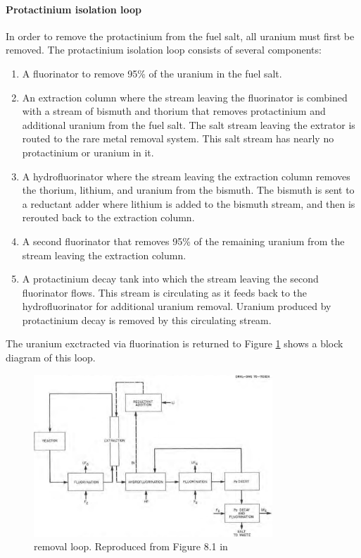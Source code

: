 \paragraph{Protactinium isolation loop}
In order to remove the protactinium from the fuel salt, all uranium must first be removed. The protactinium isolation loop consists of several components: 
\begin{enumerate}
    \item A fluorinator to remove 95\% of the uranium in the fuel salt.
    \item An extraction column where the stream leaving the fluorinator is combined with a stream of bismuth and thorium that removes protactinium and additional uranium from the fuel salt. The salt stream leaving the extrator is routed to the rare metal removal system. This salt stream has nearly no protactinium or uranium in it.
    \item A hydrofluorinator where the stream leaving the extraction column removes the thorium, lithium, and uranium from the bismuth. The bismuth is sent to a reductant adder where lithium is added to the bismuth stream, and then is rerouted back to the extraction column.
    \item A second fluorinator that removes 95\% of the remaining uranium from the stream leaving the extraction column.
    \item A protactinium decay tank into which the stream leaving the second fluorinator flows. This stream is circulating as it feeds back to the hydrofluorinator for additional uranium removal. Uranium produced by protactinium decay is removed by this circulating stream.
\end{enumerate}

The uranium exctracted via fluorination is returned to 
Figure \ref{fig:pa-removal} shows a block diagram of this loop. 

\begin{figure}[htpb]
    \centering
    \includegraphics[width=0.8\textwidth]{figs/ch4/pa_removal_loop.png}
    \caption{ removal loop. Reproduced from Figure 8.1 in \cite{robertson_conceptual_1971}}
    \label{fig:pa-removal}
\end{figure}

